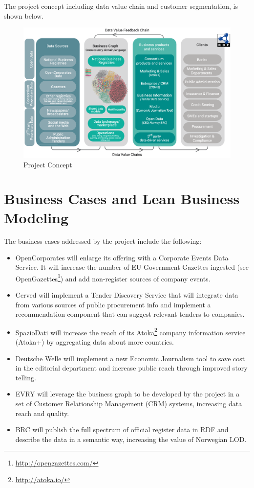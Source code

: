 \documentclass[runningheads,a4paper]{llncs}
\makeatletter
\def\maxwidth#1{\ifdim\Gin@nat@width>#1 #1\else\Gin@nat@width\fi}
\makeatother
\begin{document}
The project concept including data value chain and customer segmentation, is shown below.
\begin{figure}[h!]
\centering
\includegraphics[width=\maxwidth{\textwidth}]{img/1000020100000497000002E2C8E24D0717D0E9B2.png}
\cprotect\caption{Project Concept}
\label{}
\end{figure}


\section{Business Cases and Lean Business Modeling}

The business cases addressed by the project include the following:
\begin{itemize}
\item OpenCorporates will enlarge its offering with a Corporate Events Data Service. It will increase the number of EU Government Gazettes ingested (see OpenGazettes\footnote{\url{http://opengazettes.com/}}) and add non-register sources of company events.
\item Cerved will implement a Tender Discovery Service that will integrate data from various sources of public procurement info and implement a recommendation component that can suggest relevant tenders to companies.
\item SpazioDati will increase the reach of its Atoka\footnote{\url{http://atoka.io/}} company information service (Atoka+) by aggregating data about more countries.
\item Deutsche Welle will implement a new Economic Journalism tool to save cost in the editorial department and increase public reach through improved story telling.
\item EVRY will leverage the business graph to be developed by the project in a set of Customer Relationship Management (CRM) systems, increasing data reach and quality.
\item BRC will publish the full spectrum of official register data in RDF and describe the data in a semantic way, increasing the value of Norwegian LOD.
\end{itemize}
\end{document}

